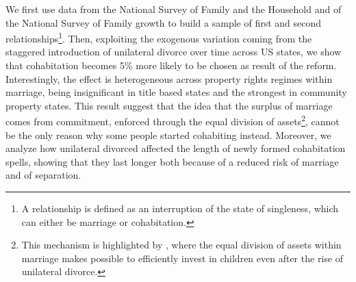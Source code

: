 \documentclass[12pt]{article}
\numberwithin{table}{section}
\begin{document}
We first use data from the National Survey of Family and the Household and of the National Survey of Family growth to build a sample of first and second relationships\footnote{A relationship is defined as an interruption of the state of singleness, which can either be marriage or cohabitation.}. Then, exploiting the exogenous variation coming from the staggered introduction of unilateral divorce over time across US states, we show that cohabitation becomes 5\% more likely  to be chosen as result of the reform. Interestingly,  the effect is heterogeneous across property rights regimes within marriage, being insignificant in title based states and the strongest in community property states. This result suggest that the idea that the surplus of marriage comes from commitment, enforced through the equal division of assets\footnote{This mechanism is highlighted by \cite{lafortune2019}, where the equal division of assets within marriage makes possible to efficiently invest in children even after the rise of unilateral divorce.}, cannot be the only reason why some people started cohabiting instead. Moreover, we analyze how unilateral divorced affected the length of newly formed cohabitation spells, showing that they last longer both because of a reduced risk of marriage and of separation.
\end{document}

